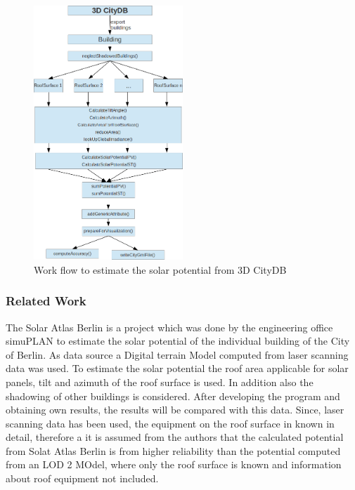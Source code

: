 \begin{figure}[ht]
	\centering
	\includegraphics[width=0.5\textwidth]{phase2/group2/figure/workflow.png}
	\caption{Work flow to estimate the solar potential from 3D CityDB}
	\label{fig:workflow}
\end{figure}
\subsubsection{Related Work}\label{sec:relatedwork}
The Solar Atlas Berlin is a project which was done by the engineering office simuPLAN to estimate the solar potential of the individual building of the City of Berlin. As data source a Digital terrain Model computed from laser scanning data was used. To estimate the solar potential the roof area applicable for solar panels, tilt and azimuth of the roof surface is used. In addition also the shadowing of other buildings is considered. After developing the program and obtaining own results, the results will be compared with this data. Since, laser scanning data has been used, the equipment on the roof surface in known in detail, therefore a it is assumed from the authors that the calculated potential from Solat Atlas Berlin is from higher reliability than the potential computed from an LOD 2 MOdel, where only the roof surface is known and information about roof equipment not included. 